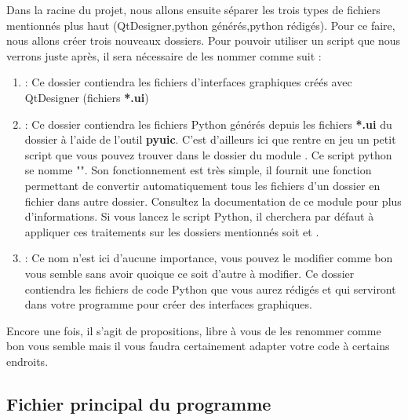 \documentclass[12pt]{report}    %
\begin{document}
Dans la racine du projet, nous allons ensuite séparer les trois types de fichiers mentionnés plus haut (QtDesigner,python générés,python rédigés). Pour ce faire, nous allons créer  trois nouveaux dossiers. Pour pouvoir utiliser un script que nous verrons juste après, il sera nécessaire de les nommer comme suit :
\begin{enumerate}

\item {} : Ce dossier contiendra les fichiers d'interfaces graphiques créés avec QtDesigner (fichiers \textbf{*.ui})\newline

\item {} : Ce dossier contiendra les fichiers Python générés depuis les fichiers \textbf{*.ui} du dossier  à l'aide de l'outil \textbf{pyuic}.\newline
C'est d'ailleurs ici que rentre en jeu un petit script que vous pouvez trouver dans le dossier du module . Ce script python se nomme "". Son fonctionnement est très simple, il fournit une fonction permettant de convertir automatiquement tous les fichiers  d'un dossier en fichier  dans autre dossier. Consultez la documentation de ce module pour plus d'informations.\newline
Si vous lancez le script Python, il cherchera par défaut à appliquer ces traitements sur les dossiers mentionnés soit  et .

\item {} : Ce nom n'est ici d'aucune importance, vous pouvez le modifier comme bon vous semble sans avoir quoique ce soit d'autre à modifier.\newline
Ce dossier contiendra les fichiers de code Python que vous aurez rédigés et qui serviront dans votre programme pour créer des interfaces graphiques.

\end{enumerate}

Encore une fois, il s'agit de propositions, libre à vous de les renommer comme bon vous semble mais il vous faudra certainement adapter votre code à certains endroits.

\subsection{Fichier principal du programme}
\end{document}
